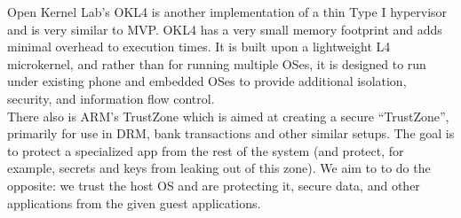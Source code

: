 Open Kernel Lab's OKL4 \cite{okl4} is another implementation of a thin Type I hypervisor and is very similar to MVP.  OKL4 has a very small memory footprint and adds minimal overhead to execution times.  It is built upon a lightweight L4 microkernel, and rather than for running multiple OSes, it is designed to run under existing phone and embedded OSes to provide additional isolation, security, and information flow control. \\

There also is ARM's TrustZone \cite{trustzone} which is aimed at creating a secure ``TrustZone'', primarily for use in DRM, bank transactions and other similar setups.  The goal is to protect a specialized app from the rest of the system (and protect, for example, secrets and keys from leaking out of this zone).  We aim to to do the opposite: we trust the host OS and are protecting it, secure data, and other applications from the given guest applications. \\